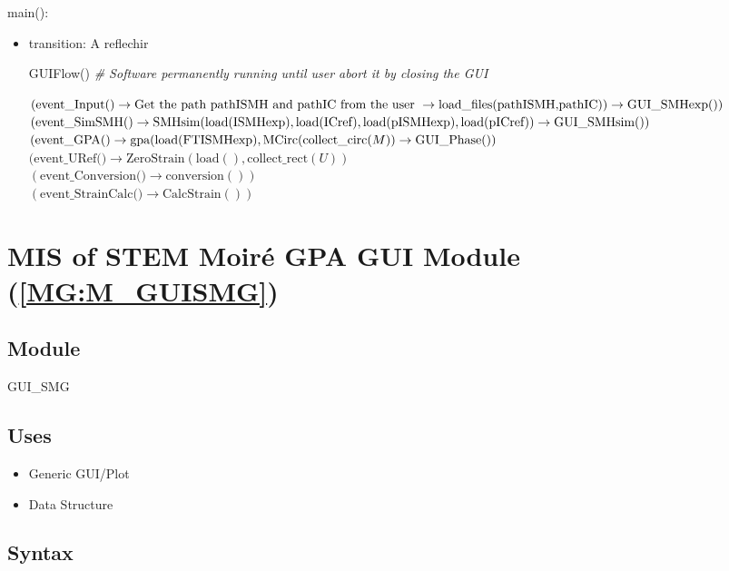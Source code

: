 \documentclass[12pt, titlepage]{article}
\begin{document}
\noindent main():
\begin{itemize}
\item transition: A reflechir 

GUIFlow()
\noindent\textit{{\#} Software permanently running until user abort it by closing the GUI} \medskip


$(\text{event{\_}Input()} \\ \rightarrow \text{Get the path pathISMH and pathIC from the user} \  \rightarrow \\ \text{load{\_}files(pathISMH,pathIC)})\rightarrow \text{GUI{\_}SMHexp}())$
\\
$(\text{event{\_}SimSMH()} \rightarrow \text{SMHsim}(\text{load(ISMHexp)},\text{load(ICref)},\text{load(pISMHexp)},\text{load(pICref)}) \\ \rightarrow \text{GUI{\_}SMHsim}())$
\\
$(\text{event{\_}GPA()} \rightarrow  \text{gpa}(\text{load(FTISMHexp)},\text{MCirc}(\text{collect{\_}circ}(M))\\ \rightarrow \text{GUI{\_}Phase}())$\\
$(\text{event{\_}URef()} \rightarrow \text{ZeroStrain}(\text{load}(),\text{collect{\_}rect}(U))$\\
$(\text{event{\_}Conversion()} \rightarrow \text{conversion}())$\\
$(\text{event{\_}StrainCalc()} \rightarrow \text{CalcStrain}())$\\

\end{itemize}

\section{MIS of STEM Moir{\'e} GPA GUI Module (\texorpdfstring{\cref{MG:M_GUISMG}}))} \label{MIS_GUISMG}

\subsection{Module}
GUI{\_}SMG
\subsection{Uses}
\begin{itemize}
\item Generic GUI/Plot
\item Data Structure
\end{itemize}

\subsection{Syntax}
\end{document}
